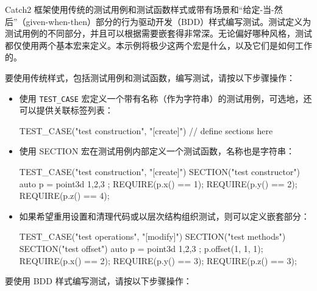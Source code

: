
Catch2 框架使用传统的测试用例和测试函数样式或带有场景和“给定-当-然后”（given-when-then）部分的行为驱动开发（BDD）样式编写测试。测试定义为测试用例的不同部分，并且可以根据需要嵌套得非常深。无论偏好哪种风格，测试都仅使用两个基本宏来定义。本示例将极少这两个宏是什么，以及它们是如何工作的。


要使用传统样式，包括测试用例和测试函数，编写测试，请按以下步骤操作：

\begin{itemize}
\item
使用 \verb|TEST_CASE| 宏定义一个带有名称（作为字符串）的测试用例，可选地，还可以提供关联标签列表：

\begin{cpp}
TEST_CASE("test construction", "[create]")
{
    // define sections here
}
\end{cpp}

\item
使用 SECTION 宏在测试用例内部定义一个测试函数，名称也是字符串：

\begin{cpp}
TEST_CASE("test construction", "[create]")
{
    SECTION("test constructor")
    {
        auto p = point3d{ 1,2,3 };
        REQUIRE(p.x() == 1);
        REQUIRE(p.y() == 2);
        REQUIRE(p.z() == 4);
    }
}
\end{cpp}

\item
如果希望重用设置和清理代码或以层次结构组织测试，则可以定义嵌套部分：

\begin{cpp}
TEST_CASE("test operations", "[modify]")
{
    SECTION("test methods")
    {
        SECTION("test offset")
        {
            auto p = point3d{ 1,2,3 };
            p.offset(1, 1, 1);
            REQUIRE(p.x() == 2);
            REQUIRE(p.y() == 3);
            REQUIRE(p.z() == 3);
        }
    }
}
\end{cpp}
\end{itemize}

要使用 BDD 样式编写测试，请按以下步骤操作：

